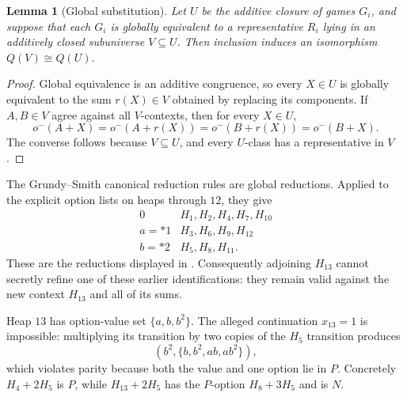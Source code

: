 \documentclass[11pt]{article}
\newtheorem{lemma}[theorem]{Lemma}
\theoremstyle{definition}
\theoremstyle{remark}
\begin{document}
\begin{lemma}[Global substitution]\label{lem:global-substitution}
Let $U$ be the additive closure of games $G_i$, and suppose that each $G_i$
is globally equivalent to a representative $R_i$ lying in an additively
closed subuniverse $V\subseteq U$.  Then inclusion induces an isomorphism
$Q(V)\cong Q(U)$.
\end{lemma}

\begin{proof}
Global equivalence is an additive congruence, so every $X\in U$ is globally
equivalent to the sum $r(X)\in V$ obtained by replacing its components.
If $A,B\in V$ agree against all $V$-contexts, then for every $X\in U$,
\[
 o^-(A+X)=o^-(A+r(X))=o^-(B+r(X))=o^-(B+X).
\]
The converse follows because $V\subseteq U$, and every $U$-class has a
representative in $V$.
\end{proof}

The Grundy--Smith canonical reduction rules are global reductions.  Applied
to the explicit option lists on heaps through $12$, they give
\[
 \begin{array}{c|l}
 0&H_1,H_2,H_4,H_7,H_{10}\\
 a=*1&H_3,H_6,H_9,H_{12}\\
 b=*2&H_5,H_8,H_{11}.
 \end{array}
\]
These are the reductions displayed in \cite[pp.~419--421]{berlekampconwayguy2001}.
Consequently adjoining $H_{13}$ cannot secretly refine one of these earlier
identifications: they remain valid against the new context $H_{13}$ and
all of its sums.

Heap $13$ has option-value set $\{a,b,b^2\}$.  The alleged continuation
$x_{13}=1$ is impossible: multiplying its transition by two copies of the
$H_5$ transition produces
\[
 (b^2,\{b,b^2,ab,ab^2\}),
\]
which violates parity because both the value and one option lie in $P$.
Concretely $H_4+2H_5$ is $P$, while $H_{13}+2H_5$ has the $P$-option
$H_8+3H_5$ and is $N$.
\end{document}
